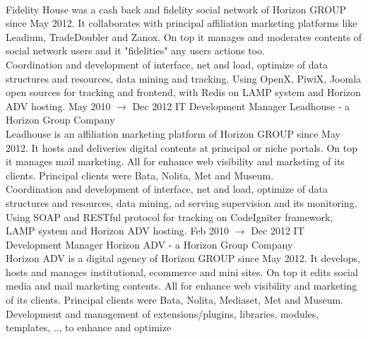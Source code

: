 \documentclass[8pt]{stackoverflow-upgraded-version} %
\begin{document}
\begin{entrylist}
		{\\
		 Fidelity House was a cash back and fidelity social network of Horizon GROUP since May 2012. It
		collaborates with principal affiliation marketing platforms like Leadium, TradeDoubler and Zanox. On top it manages and
		moderates contents of social network users and it "fidelities" any users actions too.\vspace{1mm}\\
		 Coordination and development of interface, net and load, optimize of data structures and resources, data mining and tracking.
		Using OpenX, PiwiX, Joomla open sources for tracking and frontend, with Redis on LAMP system and Horizon ADV hosting.}
	\entry
		{May 2010 $\rightarrow$ Dec 2012}
		{IT Development Manager}
		{Leadhouse - a Horizon Group Company}
		{\\
		 Leadhouse is an affiliation marketing platform of Horizon GROUP since May 2012. It hosts and
		deliveries digital contents at principal or niche portals. On top it manages mail marketing. All for enhance web visibility and
		marketing of its clients. Principal clients were Bata, Nolita, Met and Museum.\vspace{1mm}\\
		 Coordination and development of interface, net and load, optimize of data structures and resources, data
		mining, ad serving supervision and its monitoring. Using SOAP and RESTful protocol for tracking on CodeIgniter framework,
		LAMP system and Horizon ADV hosting.}
	\entry
		{Feb 2010 $\rightarrow$ Dec 2012}
		{IT Development Manager}
		{Horizon ADV - a Horizon Group Company}
		{\\
		 Horizon ADV is a digital agency of Horizon GROUP since May 2012. It develops, hosts and manages
		institutional, ecommerce and mini sites. On top it edits social media and mail marketing contents. All for enhance web
		visibility and marketing of its clients. Principal clients were Bata, Nolita, Mediaset, Met and Museum.\vspace{1mm}\\
		 Development and management of extensions/plugins, libraries, modules, templates, .., to enhance and optimize
}
\end{entrylist}
\end{document}
